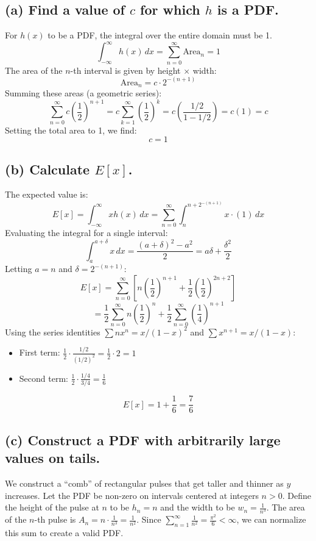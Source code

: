 \documentclass{article}
\begin{document}
\subsection*{(a) Find a value of $c$ for which $h$ is a PDF.}
For $h(x)$ to be a PDF, the integral over the entire domain must be 1.
\[ \int_{-\infty}^{\infty} h(x) \, dx = \sum_{n=0}^{\infty} \text{Area}_n = 1 \]
The area of the $n$-th interval is given by height $\times$ width:
\[ \text{Area}_n = c \cdot 2^{-(n+1)} \]
Summing these areas (a geometric series):
\[ \sum_{n=0}^{\infty} c \left(\frac{1}{2}\right)^{n+1} = c \sum_{k=1}^{\infty} \left(\frac{1}{2}\right)^k = c \left( \frac{1/2}{1 - 1/2} \right) = c(1) = c \]
Setting the total area to 1, we find:
\[ c = 1 \]

\subsection*{(b) Calculate $E[x]$.}
The expected value is:
\[ E[x] = \int_{-\infty}^{\infty} x h(x) \, dx = \sum_{n=0}^{\infty} \int_{n}^{n + 2^{-(n+1)}} x \cdot (1) \, dx \]
Evaluating the integral for a single interval:
\[ \int_{a}^{a+\delta} x \, dx = \frac{(a+\delta)^2 - a^2}{2} = a\delta + \frac{\delta^2}{2} \]
Letting $a=n$ and $\delta = 2^{-(n+1)}$:
\[ E[x] = \sum_{n=0}^{\infty} \left[ n \left(\frac{1}{2}\right)^{n+1} + \frac{1}{2} \left(\frac{1}{2}\right)^{2n+2} \right] \]
\[ = \frac{1}{2} \sum_{n=0}^{\infty} n \left(\frac{1}{2}\right)^n + \frac{1}{2} \sum_{n=0}^{\infty} \left(\frac{1}{4}\right)^{n+1} \]
Using the series identities $\sum n x^n = x/(1-x)^2$ and $\sum x^{n+1} = x/(1-x)$:
\begin{itemize}
	\item First term: $\frac{1}{2} \cdot \frac{1/2}{(1/2)^2} = \frac{1}{2} \cdot 2 = 1$
	\item Second term: $\frac{1}{2} \cdot \frac{1/4}{3/4} = \frac{1}{6}$
\end{itemize}
\[ E[x] = 1 + \frac{1}{6} = \frac{7}{6} \]

\subsection*{(c) Construct a PDF with arbitrarily large values on tails.}
We construct a ``comb'' of rectangular pulses that get taller and thinner as $y$ increases. Let the PDF be non-zero on
intervals centered at integers $n > 0$. Define the height of the pulse at $n$ to be $h_n = n$ and the width to be $w_n
	= \frac{1}{n^3}$. The area of the $n$-th pulse is $A_n = n \cdot \frac{1}{n^3} = \frac{1}{n^2}$. Since
$\sum_{n=1}^{\infty} \frac{1}{n^2} = \frac{\pi^2}{6} < \infty$, we can normalize this sum to create a valid PDF.
\end{document}
